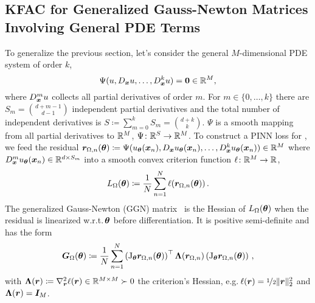 \subsection{KFAC for Generalized Gauss-Newton Matrices Involving General PDE Terms} \label{sec:KFAC-general}
To generalize the previous section, let's consider the general $M$-dimensional PDE system of order $k$,
\begin{equation}\label{eq:general-pde-system}
  \Psi(u, D_{{\bm{x}}} u, \dots, D^k_{{\bm{x}}} u) = {\bm{0}} \in {\mathbb{R}}^M,
\end{equation}
where $D^m_{\bm{x}} u$ collects all partial derivatives of order $m$.
For $m\in \{0, \dots, k\}$ there are $S_m = \binom{d + m - 1}{d - 1}$ independent partial derivatives and the total number of independent derivatives is $S \coloneqq \sum_{m=0}^k S_{m} = \binom{d + k}{k}$.
$\Psi$ is a smooth mapping from all partial derivatives to ${\mathbb{R}}^M$, $\Psi\colon \mathbb {{\mathbb{R}}}^S\to\mathbb {{\mathbb{R}}}^M$.
To construct a PINN loss for , we feed the residual ${\bm{r}}_{\Omega, n}({\bm{\theta}}) \coloneqq \Psi(u_{{\bm{\theta}}}({\bm{x}}_n), D_{{\bm{x}}} u_{{\bm{\theta}}}({\bm{x}}_n), \dots, D^k_{{\bm{x}}} u_{{\bm{\theta}}}({\bm{x}}_n)) \in {\mathbb{R}}^M$ where $D^{m}_{{\bm{x}}} u_{{\bm{\theta}}}({\bm{x}}_n) \in {\mathbb{R}}^{d \times S_{m}}$ into a smooth convex criterion function $\ell\colon {\mathbb{R}}^M \to {\mathbb{R}}$,
\begin{equation}
  L_{\Omega}({\bm{\theta}})\coloneqq \frac{1}{N}
  \sum_{n=1}^N \ell({\bm{r}}_{\Omega,n}({\bm{\theta}}))\,.
\end{equation}
The generalized Gauss-Newton (GGN) matrix~\cite{schraudolph2002fast} is the Hessian of $L_{\Omega}({\bm{\theta}})$ when the residual is linearized w.r.t.\,${\bm{\theta}}$ before differentiation. It is positive semi-definite and has the form
\begin{align}
  {\bm{G}}_{\Omega}({\bm{\theta}})
  \coloneqq
  \frac{1}{N}
  \sum_{n=1}^N
  \left(\mathrm{J}_{\bm{\theta}} {\bm{r}}_{\Omega,n}({\bm{\theta}})  \right)^\top
  {\bm{\Lambda}}({\bm{r}}_{\Omega,n})
  \left(\mathrm{J}_{\bm{\theta}} {\bm{r}}_{\Omega, n}({\bm{\theta}}) \right)\,,
\end{align}
with ${\bm{\Lambda}}({\bm{r}}) \coloneqq \nabla^2_{{\bm{r}}} \ell({\bm{r}}) \in {\mathbb{R}}^{M\times M} \succ 0$ the criterion's Hessian, e.g.\,$\ell({\bm{r}}) = \nicefrac{1}{2} \lVert {\bm{r}} \rVert_2^2$ and ${\bm{\Lambda}}({\bm{r}}) = {\bm{I}}_M$.

